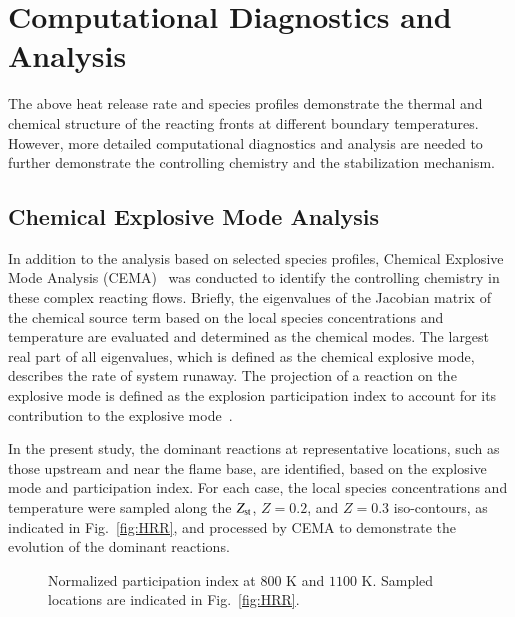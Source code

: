 \documentclass[review,3p,times]{elsarticle}
\begin{document}
\section{Computational Diagnostics and Analysis} \label{sec:diagnostics}
The above heat release rate and species profiles demonstrate the thermal and chemical structure of the reacting fronts at different boundary temperatures.  However, more detailed computational diagnostics and analysis are needed to further demonstrate the controlling chemistry and the stabilization mechanism.
\subsection{Chemical Explosive Mode Analysis}
In addition to the analysis based on selected species profiles, Chemical Explosive Mode Analysis (CEMA)~\cite{lu10,shan12} was conducted to identify the controlling chemistry in these complex reacting flows.  Briefly, the eigenvalues of the Jacobian matrix of the chemical source term based on the local species concentrations and temperature are evaluated and determined as the chemical modes.  The \textcolor{mycolor}{largest real part of all eigenvalues}, which is defined as the chemical explosive mode, describes the rate of system runaway.  The projection of a reaction on the explosive mode is defined as the explosion participation index to account for its contribution to the explosive mode\textcolor{mycolor}{~\cite{shan12}}.  

In the present study, the dominant reactions at representative locations, such as those upstream and near the flame base, are identified, based on the explosive mode and participation index.  For each case, the local species concentrations and temperature were sampled along the $Z_{\rm st}$, $Z = 0.2$, and $Z = 0.3$ iso-contours, as indicated in Fig.~\ref{fig:HRR}, and processed by CEMA to demonstrate the evolution of the dominant reactions.

\begin{figure}
  \centering
  \scriptsize
  
  
  \normalsize
  \caption{Normalized participation index at $800$ K and $1100$ K.  Sampled locations are indicated in Fig.~\ref{fig:HRR}.}
  \label{fig:CEMA}
\end{figure}
\end{document}
